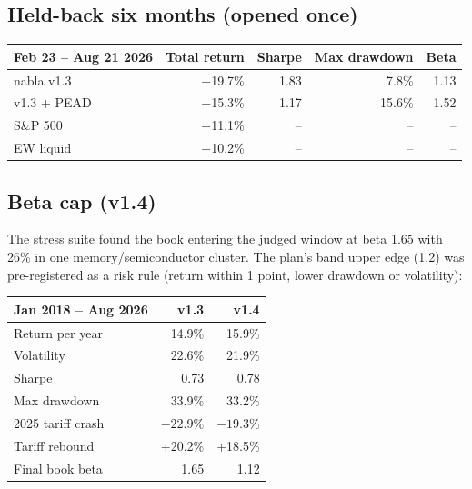 \documentclass[11pt]{article}
\begin{document}
\subsection{Held-back six months (opened once)}
\begin{table}[H]\centering\small
\begin{tabular}{lrrrr}
\toprule
Feb 23 -- Aug 21 2026 & Total return & Sharpe & Max drawdown & Beta \\
\midrule
nabla v1.3 & +19.7\% & 1.83 & 7.8\% & 1.13 \\
v1.3 + PEAD & +15.3\% & 1.17 & 15.6\% & 1.52 \\
S\&P 500 & +11.1\% & -- & -- & -- \\
EW liquid & +10.2\% & -- & -- & -- \\
\bottomrule
\end{tabular}
\end{table}

\subsection{Beta cap (v1.4)}
The stress suite found the book entering the judged window at beta 1.65 with 26\% in one memory/semiconductor
cluster. The plan's band upper edge (1.2) was pre-registered as a risk rule (return within 1 point, lower drawdown or
volatility):

\begin{table}[H]\centering\small
\begin{tabular}{lrr}
\toprule
Jan 2018 -- Aug 2026 & v1.3 & v1.4 \\
\midrule
Return per year & 14.9\% & 15.9\% \\
Volatility & 22.6\% & 21.9\% \\
Sharpe & 0.73 & 0.78 \\
Max drawdown & 33.9\% & 33.2\% \\
2025 tariff crash & $-22.9\%$ & $-19.3\%$ \\
Tariff rebound & +20.2\% & +18.5\% \\
Final book beta & 1.65 & 1.12 \\
\bottomrule
\end{tabular}
\end{table}
\end{document}
